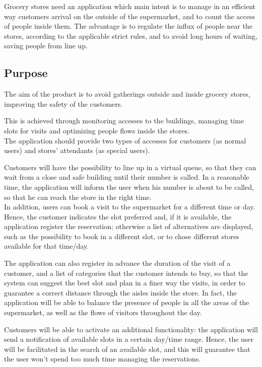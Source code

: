\documentclass[table, 12pt]{article}
\begin{document}
Grocery stores need an application which main intent is to manage in an efficient way customers arrival on the outside of the supermarket, and to count the access of people inside them. The advantage is to regulate the influx of people near the stores, according to the applicable strict rules, and to avoid long hours of waiting, saving people from line up.

\subsection{Purpose}
The aim of the product is to avoid gatherings outside and inside grocery stores,  improving the safety of the customers.

This is achieved through monitoring accesses to the buildings, managing time slots for visits and optimizing people flows inside the stores.\\

The application should provide two types of accesses for customers (as normal users) and stores' attendants (as special users).

Customers will have the possibility to line up in a virtual queue, so that they can wait from a close and safe building until their number is called. In a reasonable time, the application will inform the user when his number is about to be called, so that he can reach the store in the right time.\\

In addition, users can book a visit to the supermarket for a different time or day. Hence, the customer indicates the slot preferred and, if it is available, the application register the reservation; otherwise a list of alternatives are displayed, such as the possibility to book in a different slot, or to chose different stores available for that time/day.

The application can also register in advance the duration of the visit of a customer, and a list of categories that the customer intends to buy, so that the system can suggest the best slot and plan in a finer way the visits, in order to guarantee a correct distance through the aisles inside the store. In fact, the application will be able to balance the presence of people in all the areas of the supermarket, as well as the flows of visitors throughout the day.

Customers will be able to activate an additional functionality: the application will send a notification of available slots in a certain day/time range. Hence, the user will be facilitated in the search of an available slot, and this will guarantee that the user won't spend too much time managing the reservations.
\end{document}
